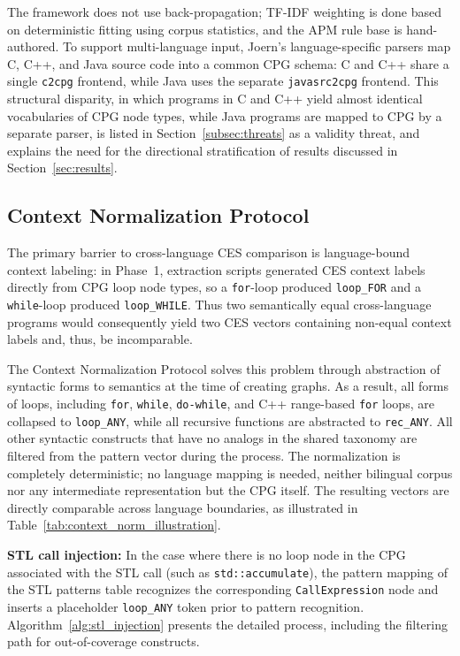 The framework does not use back-propagation; TF-IDF weighting is done based on deterministic fitting using corpus statistics, and the APM rule base is hand-authored. To support multi-language input, Joern's language-specific parsers map C, C++, and Java source code into a common CPG schema: C and C++ share a single \texttt{c2cpg} frontend, while Java uses the separate \texttt{javasrc2cpg} frontend. This structural disparity, in which programs in C and C++ yield almost identical vocabularies of CPG node types, while Java programs are mapped to CPG by a separate parser, is listed in Section~\ref{subsec:threats} as a validity threat, and explains the need for the directional stratification of results discussed in Section~\ref{sec:results}.

\subsection{Context Normalization Protocol}
\label{subsec:context_norm}
The primary barrier to cross-language CES comparison is language-bound context labeling: in Phase~1, extraction scripts generated CES context labels directly from CPG loop node types, so a \texttt{for}-loop produced \texttt{loop\_FOR} and a \texttt{while}-loop produced \texttt{loop\_WHILE}. Thus two semantically equal cross-language programs would consequently yield two CES vectors containing non-equal context labels and, thus, be incomparable.

The Context Normalization Protocol solves this problem through abstraction of syntactic forms to semantics at the time of creating graphs. As a result, all forms of loops, including \texttt{for}, \texttt{while}, \texttt{do-while}, and C++ range-based \texttt{for} loops, are collapsed to \texttt{loop\_ANY}, while all recursive functions are abstracted to \texttt{rec\_ANY}. All other syntactic constructs that have no analogs in the shared taxonomy are filtered from the pattern vector during the process. The normalization is completely deterministic; no language mapping is needed, neither bilingual corpus nor any intermediate representation but the CPG itself. The resulting vectors are directly comparable across language boundaries, as illustrated in Table~\ref{tab:context_norm_illustration}.

\textbf{STL call injection:} In the case where there is no loop node in the CPG associated with the STL call (such as \texttt{std::accumulate}), the pattern mapping of the STL patterns table recognizes the corresponding \texttt{CallExpression} node and inserts a placeholder \texttt{loop\_ANY} token prior to pattern recognition. Algorithm~\ref{alg:stl_injection} presents the detailed process, including the filtering path for out-of-coverage constructs.

